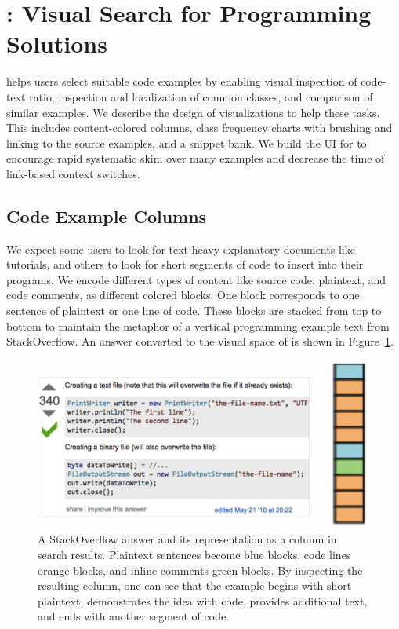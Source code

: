 \section{\systemname{}: Visual Search for Programming Solutions}

\systemname{} helps users select suitable code examples by enabling visual inspection of code-text ratio, inspection and localization of common classes, and comparison of similar examples.
We describe the design of visualizations to help these tasks.
This includes content-colored columns, class frequency charts with brushing and linking to the source examples, and a snippet bank.
We build the UI for \systemname{} to encourage rapid systematic skim over many examples and decrease the time of link-based context switches.

\subsection{Code Example Columns}

We expect some users to look for text-heavy explanatory documents like tutorials, and others to look for short segments of code to insert into their programs.
We encode different types of content like source code, plaintext, and code comments, as different colored blocks.
One block corresponds to one sentence of plaintext or one line of code.
These blocks are stacked from top to bottom to maintain the metaphor of a vertical programming example text from StackOverflow.
An answer converted to the visual space of \systemname{} is shown in Figure~\ref{fig:bar_conversion}.

\begin{figure}
 \centering
 \includegraphics[width=.9\columnwidth]{figures/so_to_ss}
 \caption{A StackOverflow answer and its representation as a column in \systemname{} search results.
    Plaintext sentences become blue blocks, code lines orange blocks, and inline comments green blocks.
    By inspecting the resulting column, one can see that the example begins with short plaintext, demonstrates the idea with code, provides additional text, and ends with another segment of code.}
 \label{fig:bar_conversion}
\end{figure}

